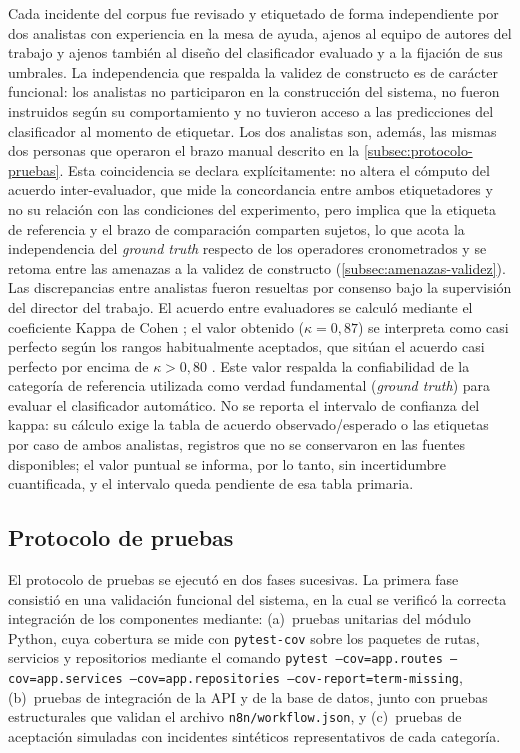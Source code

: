 Cada incidente del corpus fue revisado y etiquetado de forma independiente por dos analistas con experiencia en la mesa de ayuda, ajenos al equipo de autores del trabajo y ajenos también al diseño del clasificador evaluado y a la fijación de sus umbrales. La independencia que respalda la validez de constructo es de carácter funcional: los analistas no participaron en la construcción del sistema, no fueron instruidos según su comportamiento y no tuvieron acceso a las predicciones del clasificador al momento de etiquetar. Los dos analistas son, además, las mismas dos personas que operaron el brazo manual descrito en la \autoref{subsec:protocolo-pruebas}. Esta coincidencia se declara explícitamente: no altera el cómputo del acuerdo inter-evaluador, que mide la concordancia entre ambos etiquetadores y no su relación con las condiciones del experimento, pero implica que la etiqueta de referencia y el brazo de comparación comparten sujetos, lo que acota la independencia del \emph{ground truth} respecto de los operadores cronometrados y se retoma entre las amenazas a la validez de constructo (\autoref{subsec:amenazas-validez}). Las discrepancias entre analistas fueron resueltas por consenso bajo la supervisión del director del trabajo. El acuerdo entre evaluadores se calculó mediante el coeficiente Kappa de Cohen \parencite{Cohen1960_kappa}; el valor obtenido (\(\kappa = 0{,}87\)) se interpreta como casi perfecto según los rangos habitualmente aceptados, que sitúan el acuerdo casi perfecto por encima de \(\kappa > 0{,}80\) \parencite{Landis1977_kappa}. Este valor respalda la confiabilidad de la categoría de referencia utilizada como verdad fundamental (\emph{ground truth}) para evaluar el clasificador automático. No se reporta el intervalo de confianza del kappa: su cálculo exige la tabla de acuerdo observado/esperado o las etiquetas por caso de ambos analistas, registros que no se conservaron en las fuentes disponibles; el valor puntual se informa, por lo tanto, sin incertidumbre cuantificada, y el intervalo queda pendiente de esa tabla primaria.

\subsection{Protocolo de pruebas}\label{subsec:protocolo-pruebas}

El protocolo de pruebas se ejecutó en dos fases sucesivas. La primera fase consistió en una validación funcional del sistema, en la cual se verificó la correcta integración de los componentes mediante: (a)~pruebas unitarias del módulo Python, cuya cobertura se mide con \texttt{pytest-cov} sobre los paquetes de rutas, servicios y repositorios mediante el comando \texttt{pytest --cov=app.routes --cov=app.services --cov=app.repositories --cov-report=term-missing}, (b)~pruebas de integración de la API y de la base de datos, junto con pruebas estructurales que validan el archivo \texttt{n8n/workflow.json}, y (c)~pruebas de aceptación simuladas con incidentes sintéticos representativos de cada categoría.

